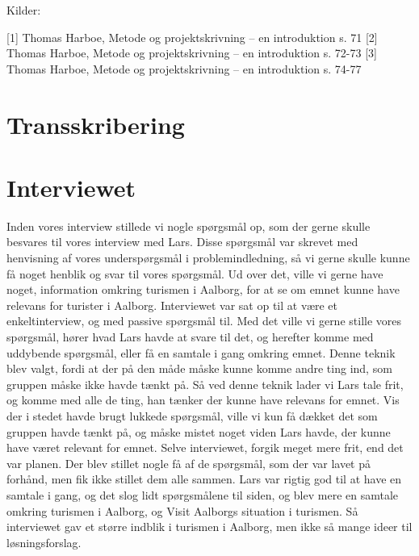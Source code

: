 Kilder:

[1] Thomas Harboe, Metode og projektskrivning – en introduktion s. 71
[2] Thomas Harboe, Metode og projektskrivning – en introduktion s. 72-73
[3] Thomas Harboe, Metode og projektskrivning – en introduktion s. 74-77



\section{Transskribering}

\section{Interviewet}
Inden vores interview stillede vi nogle spørgsmål op, som der gerne skulle besvares til vores interview med Lars. Disse spørgsmål var skrevet med henvisning af vores underspørgsmål i problemindledning, så vi gerne skulle kunne få noget henblik og svar til vores spørgsmål. Ud over det, ville vi gerne have noget, information omkring turismen i Aalborg, for at se om emnet kunne have relevans for turister i Aalborg. 
Interviewet var sat op til at være et enkeltinterview, og med passive spørgsmål til. Med det ville vi gerne stille vores spørgsmål, hører hvad Lars havde at svare til det, og herefter komme med uddybende spørgsmål, eller få en samtale i gang omkring emnet. Denne teknik blev valgt, fordi at der på den måde måske kunne komme andre ting ind, som gruppen måske ikke havde tænkt på. Så ved denne teknik lader vi Lars tale frit, og komme med alle de ting, han tænker der kunne have relevans for emnet. Vis der i stedet havde brugt lukkede spørgsmål, ville vi kun få dækket det som gruppen havde tænkt på, og måske mistet noget viden Lars havde, der kunne have været relevant for emnet. 
Selve interviewet, forgik meget mere frit, end det var planen. Der blev stillet nogle få af de spørgsmål, som der var lavet på forhånd, men fik ikke stillet dem alle sammen. Lars var rigtig god til at have en samtale i gang, og det slog lidt spørgsmålene til siden, og blev mere en samtale omkring turismen i Aalborg, og Visit Aalborgs situation i turismen. Så interviewet gav et større indblik i turismen i Aalborg, men ikke så mange ideer til løsningsforslag.

